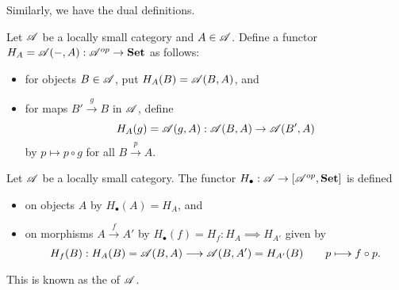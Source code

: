 Similarly, we have the dual definitions. 

\begin{definition}
    Let $\mathscr A$ be a locally small category and $A\in\mathscr A$. Define a functor $H_A = \mathscr A(-, A): \mathscr A^{op}\to\mathbf{Set}$ as follows: 
    \begin{itemize}
        \item for objects $B\in\mathscr A$, put $H_A(B) = \mathscr A(B, A)$, and 
        \item for maps $B'\xrightarrow{g} B$ in $\mathscr A$, define 
        \begin{equation*}
            H_A(g) = \mathscr A(g, A): \mathscr A(B, A)\to\mathscr A(B', A)
        \end{equation*}
        by $p\mapsto p\circ g$ for all $B\xrightarrow{p} A$.
    \end{itemize}
\end{definition}

\begin{definition}
    Let $\mathscr A$ be a locally small category. The functor $H_\bullet: \mathscr A\to[\mathscr A^{op}, \mathbf{Set}]$ is defined 
    \begin{itemize}
        \item on objects $A$ by $H_\bullet(A) = H_A$, and 
        \item on morphisms $A\xrightarrow{f} A'$ by $H_\bullet(f) = H_f: H_A\implies H_{A'}$ given by 
        \begin{equation*}
            H_f(B): H_A(B) = \mathscr A(B, A)\longrightarrow\mathscr A(B, A') = H_{A'}(B)\qquad p\longmapsto f\circ p.
        \end{equation*}
    \end{itemize}
    This is known as the  of $\mathscr A$.
\end{definition}

